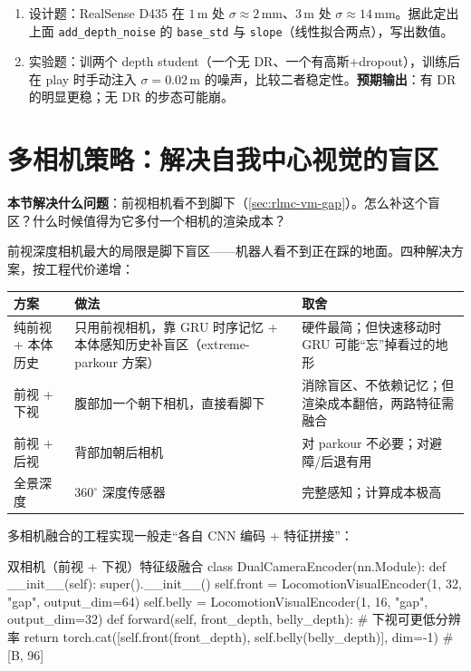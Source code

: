 \begin{practice}
\begin{enumerate}
\item 设计题：RealSense D435 在 $1$\,m 处 $\sigma\approx 2$\,mm、$3$\,m 处 $\sigma\approx 14$\,mm。据此定出上面 \verb|add_depth_noise| 的 \verb|base_std| 与 \verb|slope|（线性拟合两点），写出数值。
\item 实验题：训两个 depth student（一个无 DR、一个有高斯+dropout），训练后在 play 时手动注入 $\sigma=0.02$\,m 的噪声，比较二者稳定性。\textbf{预期输出}：有 DR 的明显更稳；无 DR 的步态可能崩。
\end{enumerate}
\end{practice}

\section{多相机策略：解决自我中心视觉的盲区}
\label{sec:rlmc-vm-multicam}

\textbf{本节解决什么问题}：前视相机看不到脚下（\cref{sec:rlmc-vm-gap}）。怎么补这个盲区？什么时候值得为它多付一个相机的渲染成本？

前视深度相机最大的局限是脚下盲区——机器人看不到正在踩的地面。四种解决方案，按工程代价递增：

\begin{center}
\small
\begin{tabular}{@{}p{2.4cm}p{4.6cm}p{4.4cm}@{}}
\toprule
方案 & 做法 & 取舍 \\
\midrule
纯前视 + 本体历史 & 只用前视相机，靠 GRU 时序记忆 + 本体感知历史补盲区（extreme-parkour 方案） & 硬件最简；但快速移动时 GRU 可能“忘”掉看过的地形 \\
前视 + 下视 & 腹部加一个朝下相机，直接看脚下 & 消除盲区、不依赖记忆；但渲染成本翻倍，两路特征需融合 \\
前视 + 后视 & 背部加朝后相机 & 对 parkour 不必要；对避障/后退有用 \\
全景深度 & $360^\circ$ 深度传感器 & 完整感知；计算成本极高 \\
\bottomrule
\end{tabular}
\end{center}

多相机融合的工程实现一般走“各自 CNN 编码 + 特征拼接”：

\begin{codebox}[Python]{双相机（前视 + 下视）特征级融合}
class DualCameraEncoder(nn.Module):
    def __init__(self):
        super().__init__()
        self.front = LocomotionVisualEncoder(1, 32, "gap", output_dim=64)
        self.belly = LocomotionVisualEncoder(1, 16, "gap", output_dim=32)
    def forward(self, front_depth, belly_depth):   # 下视可更低分辨率
        return torch.cat([self.front(front_depth),
                          self.belly(belly_depth)], dim=-1)  # [B, 96]
\end{codebox}

